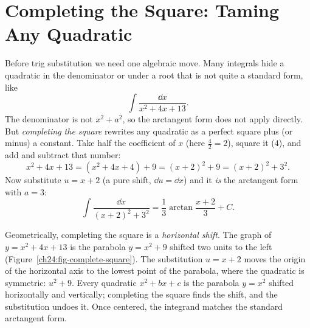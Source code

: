 \section{Completing the Square: Taming Any Quadratic}
\label{ch24:complete-square}

Before trig substitution we need one algebraic move. Many
integrals hide a quadratic in the denominator or under a root that is not
quite a standard form, like
\[
\int \frac{\dd x}{x^2 + 4x + 13}.
\]
The denominator is not $x^2 + a^2$, so the arctangent form does not apply
directly. But \emph{completing the square} rewrites any quadratic as a
perfect square plus (or minus) a constant. Take half the coefficient of $x$
(here $\tfrac42 = 2$), square it ($4$), and add and subtract that number:
\[
x^2 + 4x + 13 = (x^2 + 4x + 4) + 9 = (x+2)^2 + 9 = (x+2)^2 + 3^2.
\]
Now substitute $u = x + 2$ (a pure shift, $\dd u = \dd x$) and it \emph{is} the
arctangent form with $a = 3$:
\[
\int \frac{\dd x}{(x+2)^2 + 3^2}
= \frac{1}{3}\arctan\!\frac{x+2}{3} + C.
\]

\begin{happeningbox}
Geometrically, completing the square is a \emph{horizontal shift}. The graph of
$y = x^2 + 4x + 13$ is the parabola $y = x^2 + 9$ shifted two units to the left
(Figure~\ref{ch24:fig-complete-square}). The substitution $u = x+2$ moves the
origin of the horizontal axis to the lowest point of the parabola, where the
quadratic is symmetric: $u^2 + 9$. Every quadratic $x^2 + bx + c$ is the
parabola $y=x^2$ shifted horizontally and vertically; completing the square
finds the shift, and the substitution undoes it. Once centered, the integrand
matches the standard arctangent form.
\end{happeningbox}

